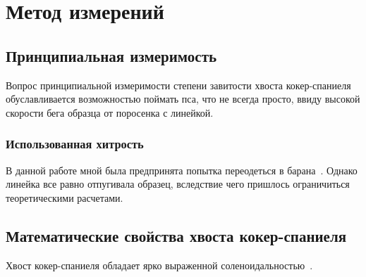 \chapter{Метод измерений}

\section{Принципиальная измеримость}

Вопрос принципиальной измеримости степени завитости хвоста кокер-спаниеля обуславливается возможностью поймать пса, что не всегда просто, ввиду высокой скорости бега образца от поросенка с линейкой.

\subsection{Использованная хитрость}

В данной работе мной была предпринята попытка переодеться в барана~\cite{wiki:baran}. Однако линейка все равно отпугивала образец, вследствие чего пришлось ограничиться теоретическими расчетами.

\section{Математические свойства хвоста кокер-спаниеля}

Хвост кокер-спаниеля обладает ярко выраженной соленоидальностью~\cite{wiki:solvf}.